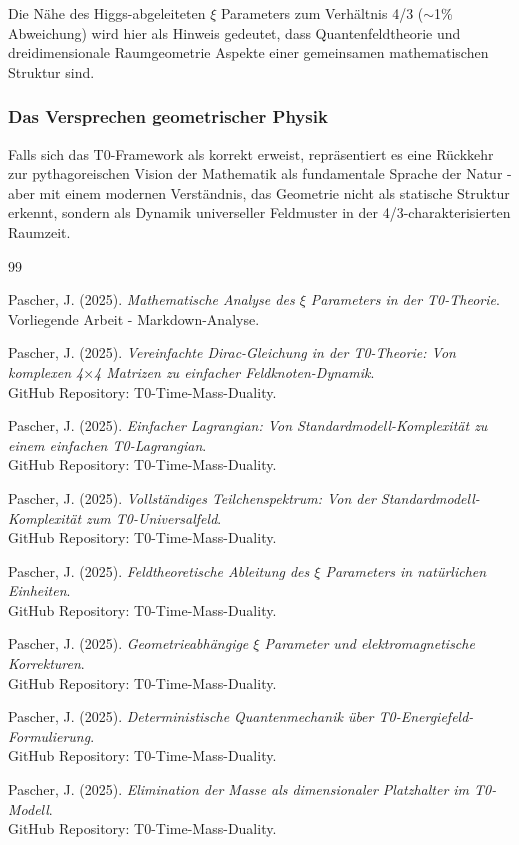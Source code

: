 	Die Nähe des Higgs-abgeleiteten $\xi$ Parameters zum Verhältnis 4/3 ($\sim$1\% Abweichung) wird hier als Hinweis gedeutet, dass Quantenfeldtheorie und dreidimensionale Raumgeometrie Aspekte einer gemeinsamen mathematischen Struktur sind.
	
	\subsubsection{Das Versprechen geometrischer Physik}
	\label{subsubsec:versprechen_geometrischer_physik}
	
	Falls sich das T0-Framework als korrekt erweist, repräsentiert es eine Rückkehr zur pythagoreischen Vision der Mathematik als fundamentale Sprache der Natur - aber mit einem modernen Verständnis, das Geometrie nicht als statische Struktur erkennt, sondern als Dynamik universeller Feldmuster in der 4/3-charakterisierten Raumzeit.
	
	\begin{thebibliography}{99}
		
		Pascher, J. (2025). \textit{Mathematische Analyse des $\xi$ Parameters in der T0-Theorie}. \\
		Vorliegende Arbeit - Markdown-Analyse.
		
		Pascher, J. (2025). \textit{Vereinfachte Dirac-Gleichung in der T0-Theorie: Von komplexen 4$\times$4 Matrizen zu einfacher Feldknoten-Dynamik}. \\
		GitHub Repository: T0-Time-Mass-Duality.
		
		Pascher, J. (2025). \textit{Einfacher Lagrangian: Von Standardmodell-Komplexität zu einem einfachen T0-Lagrangian}. \\
		GitHub Repository: T0-Time-Mass-Duality.
		
		Pascher, J. (2025). \textit{Vollständiges Teilchenspektrum: Von der Standardmodell-Komplexität zum T0-Universalfeld}. \\
		GitHub Repository: T0-Time-Mass-Duality.
		
		Pascher, J. (2025). \textit{Feldtheoretische Ableitung des $\xi$ Parameters in natürlichen Einheiten}. \\
		GitHub Repository: T0-Time-Mass-Duality.
		
		Pascher, J. (2025). \textit{Geometrieabhängige $\xi$ Parameter und elektromagnetische Korrekturen}. \\
		GitHub Repository: T0-Time-Mass-Duality.
		
		Pascher, J. (2025). \textit{Deterministische Quantenmechanik über T0-Energiefeld-Formulierung}. \\
		GitHub Repository: T0-Time-Mass-Duality.
		
		Pascher, J. (2025). \textit{Elimination der Masse als dimensionaler Platzhalter im T0-Modell}. \\
		GitHub Repository: T0-Time-Mass-Duality.
		
	\end{thebibliography}
	